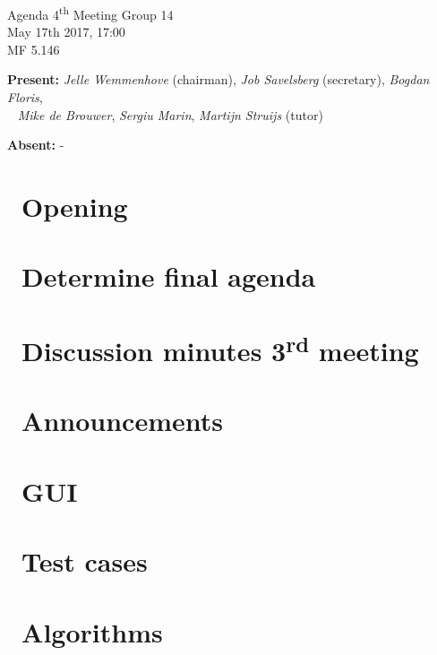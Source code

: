 \documentclass[a4paper,twoside,11pt]{article}
\title{}
\date{}
\newcommand{\ts}{\textsuperscript}
\begin{document}

\begin{center}
\Huge{Agenda 4\ts{th} Meeting Group 14}
\\\vspace*{2mm}
\Large{May 17th 2017, 17:00}
\\\vspace*{2mm}
\large{MF 5.146}
\\
\end{center}

		\textbf{Present:} \textit{Jelle Wemmenhove} (chairman), \textit{Job Savelsberg} (secretary), \textit{Bogdan Floris}, 
\\\indent\qquad\,\,\,\,\,\qquad\quad \textit{Mike de Brouwer},  \textit{Sergiu Marin}, \textit{Martijn Struijs} (tutor)


	    \textbf{Absent:} -\\

	    
\hline


\section{\ Opening}

\section{\ Determine final agenda}

\section{\ Discussion minutes 3\ts{rd} meeting}

\section{\ Announcements}

\section{\ GUI}

\section{\ Test cases}



\section{\ Algorithms}
\end{document}
